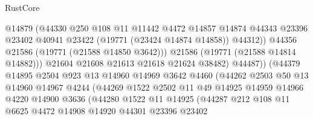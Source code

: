 \begin{lexlean}{RustCore}
\begin{coremodule}
                                  @14879
                                  (@44330
                                    @250
                                    @108
                                    @11
                                    @11442
                                    @4472
                                    @14857
                                    @14874
                                    @44343
                                    @23396
                                    @23402
                                    @40941
                                    @23422
                                    (@19771 (@23424 @14874 @14858))
                                    @44312))
                                @44356
                                @21586
                                (@19771 (@21588 @14850 @3642)))
                              @21586
                              (@19771 (@21588 @14814 @14882)))
                            @21604
                            @21608
                            @21613
                            @21618
                            @21624
                            @38482)
                          @44487))
                      (@44379
                        @14895
                        @2504
                        @923
                        @13
                        @14960
                        @14969
                        @3642
                        @4460
                        (@44262
                          @2503
                          @50
                          @13
                          @14960
                          @14967
                          @4244
                          (@44269
                            @1522
                            @2502
                            @11
                            @49
                            @14925
                            @14959
                            @14966
                            @4220
                            @14900
                            @3636
                            (@44280
                              @1522
                              @11
                              @14925
                              (@44287
                                @212
                                @108
                                @11
                                @6625
                                @4472
                                @14908
                                @14920
                                @44301
                                @23396
                                @23402

\end{coremodule}
\end{lexlean}
